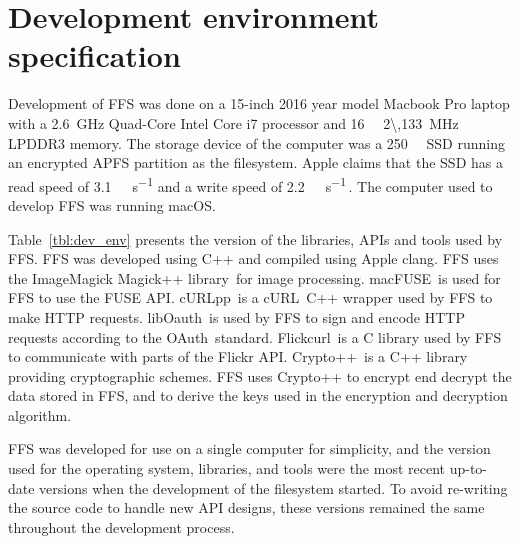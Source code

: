 \section{Development environment specification}
\label{sec:dev_env}
Development of \gls{FFS} was done on a 15-inch 2016 year model Macbook Pro laptop with a \SI{2.6}{\giga\hertz} \mbox{Quad-Core} Intel Core i7 processor and \SI{16}{\giga\byte} \SI{2\,133}{\mega\hertz} LPDDR3 memory. The storage device of the computer was a \SI{250}{\giga\byte} \gls{SSD} running an encrypted \gls{APFS} partition as the filesystem. Apple claims that the \gls{SSD} has a read speed of \SI[per-mode = symbol]{3.1}{\giga\byte\per\second} and a write speed of \SI[per-mode = symbol]{2.2}{\giga\byte\per\second}\,\cite{lovejoyNew15inchMacBook2016}. The computer used to develop FFS was running macOS.

Table~\ref{tbl:dev_env} presents the version of the libraries, \gls{API}s and tools used by FFS. FFS was developed using C++ and compiled using Apple clang. \gls{FFS} uses the ImageMagick Magick++ library\,\cite{ImageMagick2022} for image processing. macFUSE\,\cite{HomeMacFUSE} is used for \gls{FFS} to use the \gls{FUSE} \gls{API}. cURLpp\,\cite{barrette-lapierreCURLpp2022} is a cURL\,\cite{CurlCurl2022} C++ wrapper used by \gls{FFS} to make HTTP requests. libOauth\,\cite{Liboauth} is used by \gls{FFS} to sign and encode HTTP requests according to the OAuth\,\cite{barrette-lapierreCURLpp2022} standard. Flickcurl\,\cite{beckettFlickcurlLibraryFlickr} is a C library used by \gls{FFS} to communicate with parts of the Flickr \gls{API}. Crypto++\,\cite{CryptoLibraryFree} is a C++ library providing cryptographic schemes. \gls{FFS} uses Crypto++ to encrypt end decrypt the data stored in \gls{FFS}, and to derive the keys used in the encryption and decryption algorithm. 

\gls{FFS} was developed for use on a single computer for simplicity, and the version used for the operating system, libraries, and tools were the most recent \mbox{up-to-date} versions when the development of the filesystem started. To avoid \mbox{re-writing} the source code to handle new \gls{API} designs, these versions remained the same throughout the development process.

